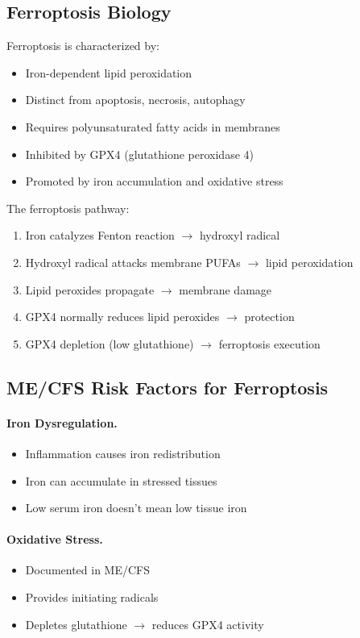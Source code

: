 \subsection{Ferroptosis Biology}

Ferroptosis is characterized by:

\begin{itemize}
    \item Iron-dependent lipid peroxidation
    \item Distinct from apoptosis, necrosis, autophagy
    \item Requires polyunsaturated fatty acids in membranes
    \item Inhibited by GPX4 (glutathione peroxidase 4)
    \item Promoted by iron accumulation and oxidative stress
\end{itemize}

The ferroptosis pathway:
\begin{enumerate}
    \item Iron catalyzes Fenton reaction $\rightarrow$ hydroxyl radical
    \item Hydroxyl radical attacks membrane PUFAs $\rightarrow$ lipid peroxidation
    \item Lipid peroxides propagate $\rightarrow$ membrane damage
    \item GPX4 normally reduces lipid peroxides $\rightarrow$ protection
    \item GPX4 depletion (low glutathione) $\rightarrow$ ferroptosis execution
\end{enumerate}

\subsection{ME/CFS Risk Factors for Ferroptosis}

\paragraph{Iron Dysregulation.}
\begin{itemize}
    \item Inflammation causes iron redistribution
    \item Iron can accumulate in stressed tissues
    \item Low serum iron doesn't mean low tissue iron
\end{itemize}

\paragraph{Oxidative Stress.}
\begin{itemize}
    \item Documented in ME/CFS
    \item Provides initiating radicals
    \item Depletes glutathione $\rightarrow$ reduces GPX4 activity
\end{itemize}

